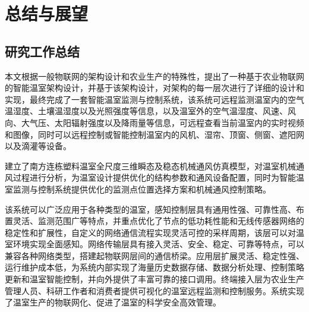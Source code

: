 
\chapter{总结与展望}
\label{chapter:Conclusion}

\section{研究工作总结}
本文根据一般物联网的架构设计和农业生产的特殊性，提出了一种基于农业物联网的智能温室架构设计，并基于该架构设计，对架构的每一层次进行了详细的设计和实现，最终完成了一套智能温室监测与控制系统，该系统可远程监测温室内的空气温湿度、土壤温湿度以及光照强度等信息，以及温室外的空气温湿度、风速、风向、大气压、太阳辐射强度以及降雨量等信息，可远程查看当前温室内的实时视频和图像，同时可以远程控制或智能控制温室内的风机、湿帘、顶窗、侧窗、遮阳网以及滴灌等设备。

建立了南方连栋塑料温室全尺度三维瞬态及稳态机械通风仿真模型，对温室机械通风过程进行分析，为温室设计提供优化的结构参数和通风设备配置，同时为智能温室监测与控制系统提供优化的监测点位置选择方案和机械通风控制策略。

该系统可以广泛应用于各种类型的温室，感知控制层具有通用性强、可靠性高、布置灵活、监测范围广等特点，并重点优化了节点的低功耗性能和无线传感器网络的稳定性和扩展性，自定义的网络通信流程实现灵活可控的采样周期，该层可以对温室环境实现全面感知。网络传输层具有接入灵活、安全、稳定、可靠等特点，可以兼容各种网络类型，搭建起物联网层间的通信桥梁。应用层扩展灵活、稳定性强、运行维护成本低，为系统内部实现了海量历史数据存储、数据分析处理、控制策略更新和温室智能控制，并向外提供了丰富可靠的接口调用。终端接入层为农业生产管理人员、科研工作者和消费者提供可视化的温室远程监测和控制服务。系统实现了温室生产的物联网化、促进了温室的科学安全高效管理。

